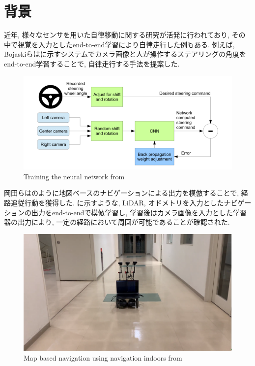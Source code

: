 
\section{背景}
近年, 様々なセンサを用いた自律移動に関する研究が活発に行われており, その中で視覚を入力としたend-to-end学習により自律走行した例もある. 例えば, Bojaskiらはに示すシステムでカメラ画像と人が操作するステアリングの角度をend-to-end学習することで, 自律走行する手法を提案した\cite{bojaski}.

\vspace{20mm}

\begin{figure}[hbtp]
\centering
\includegraphics[keepaspectratio, scale=0.5]
{images/bojaski.png}
\caption{Training the neural network from \cite{bojaski}}
\label{Fig:bojaski}
\end{figure}

\newpage
岡田らはのように地図ベースのナビゲーションによる出力を模倣することで, 経路追従行動を獲得した\cite{okada-si}. に示すような, LiDAR, オドメトリを入力としたナビゲーションの出力をend-to-endで模倣学習し, 学習後はカメラ画像を入力とした学習器の出力により, 一定の経路において周回が可能であることが確認された. 

\vspace{20mm}

\begin{figure}[h]
     \centering
     \includegraphics[keepaspectratio, scale=0.15]
     {images/tsudanuma2-3.png}
     \caption{Map based navigation using navigation indoors from \cite{okada-si}}
     \label{Fig:tsudanuma2-3}
     \end{figure}

